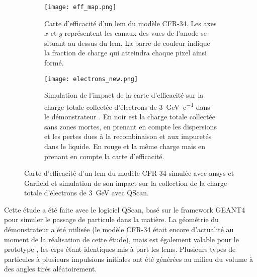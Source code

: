       \begin{figure}[!htb]
        \begin{subfigure}{0.48\textwidth}
          \centering
          \texttt{[image: eff\_map.png]}
          \caption{\label{fig::eff_map}Carte d'efficacité d'un \gls{lem} du modèle CFR-34. Les axes $x$ et $y$ représentent les  canaux des vues de l'anode se situant au dessus du \gls{lem}. La barre de couleur indique la fraction de charge qui atteindra chaque pixel ainsi formé.}
        \end{subfigure}
        \hfill
        \begin{subfigure}{0.48\textwidth}
          \centering
          \texttt{[image: electrons\_new.png]}
          \caption{\label{fig::electron}Simulation de l'impact de la carte d'efficacité sur la charge totale collectée d'électrons de \SI{3}{\giga\eV\per c} dans le démonstrateur \SSS{}. En noir est la charge totale collectée sans zones mortes, en prenant en compte les dispersions et les pertes dues à la recombinaison et aux impuretés dans le liquide. En rouge et la même charge mais en prenant en compte la carte d'efficacité.}
        \end{subfigure}
          \caption[Carte d'efficacité d'un LEM du modèle CFR-34 et impact sur la collection de charge]{Carte d'efficacité d'un \gls{lem} du modèle CFR-34 simulée avec \gls{ansys} et Garfield et simulation de son impact sur la collection de la charge totale d'électrons de \SI{3}{\giga\eV} avec QScan.}
      \end{figure}
        
      Cette étude a été faite avec le logiciel QScan, basé sur le framework GEANT4 pour simuler le passage de particule dans la matière. La géométrie du démonstrateur \SSS{} a été utilisée (le modèle CFR-34 était encore d'actualité au moment de la réalisation de cette étude), mais est également valable pour le prototype \TOO{}, les \glspl{crp} étant identiques mis à part les \glspl{lem}. Plusieurs types de particules à plusieurs impulsions initiales ont été générées au milieu du volume à des angles tirés aléatoirement.
            
